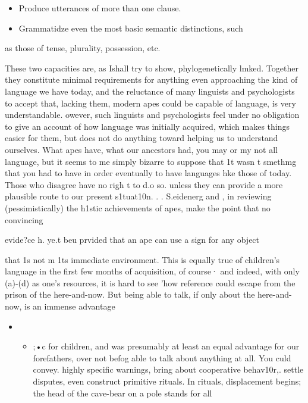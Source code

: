 
\begin{itemize}
\item Produce utterances of more than one clause.
\item Grammatidze even the most basic semantic distinctions, such
\end{itemize}

as those of tense, plurality, possession, etc.

These two capacities are, as Ishall try to show, phylogenetically lmked. Together they constitute minimal requirements for anything even approaching the kind of language we have today, and the reluc\-tance of many linguists and psychologists to accept that, lacking them, modern apes could be capable of language, is very understandable. owever, such linguists and psychologists feel under no obligation to give an account of how language was initially acquired, which makes things easier for them, but does not do anything toward helping us to understand ourselves. What apes have, what our ancestors had, you may or my not all language, but it seems to me simply bizarre to suppose
that 1t wasn t smethmg that you had to have in order eventually to
have languages hke those of today. Those who disagree have no righ t to
d.o so. unless they can provide a more plausible route to our present s1tuat10n.
. . S.eidenerg and \citet{Petitto1979}, in reviewing (pessimistically) the h1stic achievements of apes, make the point that no convincing

evide?ce h{\textquotedbl}{\textquotedbl}. ye.t beu prvided that an ape can use a sign for any object

that 1s not m 1ts immediate environment. This is equally true of chil\-dren's language in the first few months of acquisition, of course· and indeed, with only (a)-(d) as one's resources, it is hard to see 'how reference could escape from the prison of the here-and-now. But being able to talk, if only about the here-and-now, is an immense advantage

\begin{itemize}
\item \begin{itemize}
\item ;•c for children, and was presumably at least an equal advantage for our forefathers, over not befog able to talk about anything at all. You culd convey. highly specific warnings, bring about cooperative beha\-v10r,. settle disputes, even construct primitive rituals. In rituals, dis\-placement begins; the head of the cave-bear on a pole stands for all
\end{itemize}
\end{itemize}

